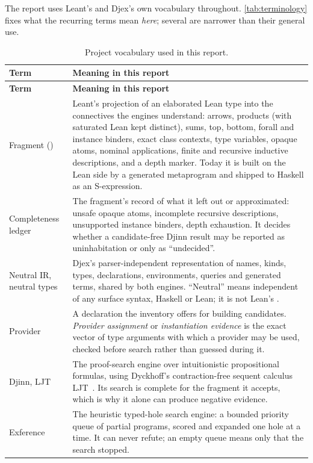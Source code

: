 \documentclass[10pt,letterpaper,oneside]{report}
\newcommand{\code}[1]{\texttt{\detokenize{#1}}}
\begin{document}
The report uses Leant's and Djex's own vocabulary throughout. \autoref{tab:terminology} fixes what the recurring terms mean \emph{here}; several are narrower than their general use.

\begin{longtable}{@{}L{0.21\textwidth}L{0.71\textwidth}@{}}
\caption{Project vocabulary used in this report.}\label{tab:terminology}\\
\toprule
\textbf{Term} & \textbf{Meaning in this report} \\
\midrule
\endfirsthead
\toprule
\textbf{Term} & \textbf{Meaning in this report} \\
\midrule
\endhead
\bottomrule
\endfoot
Fragment (\code{Frag}) & Leant's projection of an elaborated Lean type into the connectives the engines understand: arrows, products (with saturated Lean \code{Prod} kept distinct), sums, top, bottom, forall and instance binders, exact class contexts, type variables, opaque atoms, nominal applications, finite and recursive inductive descriptions, and a depth marker. Today it is built on the Lean side by a generated \code{run_tac} metaprogram and shipped to Haskell as an S-expression. \\
Completeness ledger & The fragment's record of what it left out or approximated: unsafe opaque atoms, incomplete recursive descriptions, unsupported instance binders, depth exhaustion. It decides whether a candidate-free Djinn result may be reported as uninhabitation or only as ``undecided''. \\
Neutral IR, neutral types & Djex's parser-independent representation of names, kinds, types, declarations, environments, queries and generated terms, shared by both engines. ``Neutral'' means independent of any surface syntax, Haskell or Lean; it is not Lean's \code{Expr}. \\
Provider & A declaration the inventory offers for building candidates. \emph{Provider assignment} or \emph{instantiation evidence} is the exact vector of type arguments with which a provider may be used, checked before search rather than guessed during it. \\
Djinn, LJT & The proof-search engine over intuitionistic propositional formulas, using Dyckhoff's contraction-free sequent calculus LJT~\cite{dyckhoff}. Its search is complete for the fragment it accepts, which is why it alone can produce negative evidence. \\
Exference & The heuristic typed-hole search engine: a bounded priority queue of partial programs, scored and expanded one hole at a time. It can never refute; an empty queue means only that the search stopped. \\

\end{longtable}
\end{document}
